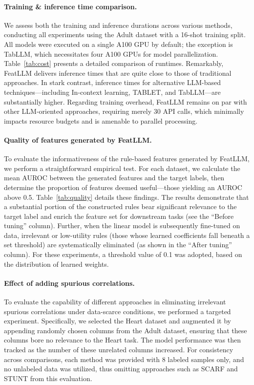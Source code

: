 \vspace*{-0.12in}
\paragraph{Training \& inference time comparison.} We assess both the training and inference durations across various methods, conducting all experiments using the Adult dataset with a 16-shot training split. All models were executed on a single A100 GPU by default; the exception is TabLLM, which necessitates four A100 GPUs for model parallelization. Table~\ref{tab:cost} presents a detailed comparison of runtimes. Remarkably, \textsf{FeatLLM} delivers inference times that are quite close to those of traditional approaches. In stark contrast, inference times for alternative LLM-based techniques—including In-context learning, TABLET, and TabLLM—are substantially higher. Regarding training overhead, \textsf{FeatLLM} remains on par with other LLM-oriented approaches, requiring merely 30 API calls, which minimally impacts resource budgets and is amenable to parallel processing.

\vspace*{-0.12in}
\paragraph{Quality of features generated by \textsf{FeatLLM}.}
To evaluate the informativeness of the rule-based features generated by \textsf{FeatLLM}, we perform a straightforward empirical test. For each dataset, we calculate the mean AUROC between the generated features and the target labels, then determine the proportion of features deemed useful—those yielding an AUROC above 0.5. Table~\ref{tab:quality} details these findings. The results demonstrate that a substantial portion of the constructed rules bear significant relevance to the target label and enrich the feature set for downstream tasks (see the ``Before tuning'' column). Further, when the linear model is subsequently fine-tuned on data, irrelevant or low-utility rules (those whose learned coefficients fall beneath a set threshold) are systematically eliminated (as shown in the ``After tuning'' column). For these experiments, a threshold value of 0.1 was adopted, based on the distribution of learned weights.

\vspace*{-0.12in}
\paragraph{Effect of adding spurious correlations.} To evaluate the capability of different approaches in eliminating irrelevant spurious correlations under data-scarce conditions, we performed a targeted experiment. Specifically, we selected the Heart dataset and augmented it by appending randomly chosen columns from the Adult dataset, ensuring that these columns bore no relevance to the Heart task. The model performance was then tracked as the number of these unrelated columns increased. For consistency across comparisons, each method was provided with 8 labeled samples only, and no unlabeled data was utilized, thus omitting approaches such as SCARF and STUNT from this evaluation.

